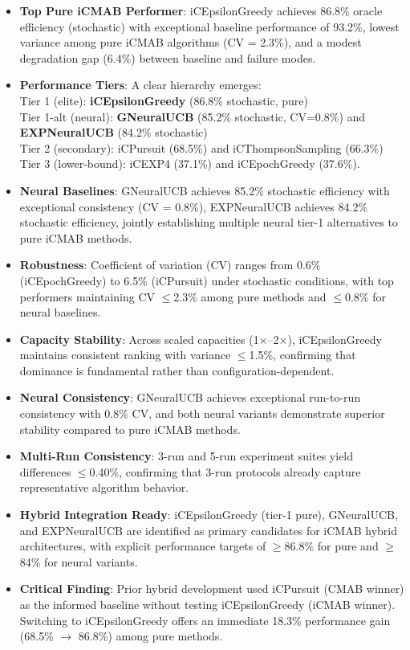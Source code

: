 \documentclass[12pt,a4paper]{article}
\newcommand{\primarytext}[1]{\textcolor{primaryblue}{\textbf{#1}}}
\newcommand{\secondarytext}[1]{\textcolor{secondaryblue}{\textbf{#1}}}
\newcommand{\success}[1]{\textcolor{accentgreen}{\textbf{#1}}}
\newcommand{\warning}[1]{\textcolor{warningred}{\textbf{#1}}}
\newcommand{\legacy}[1]{\textcolor{legacycolor}{\textbf{#1}}}
\newcommand{\neural}[1]{\textcolor{neuralcolor}{\textbf{#1}}}
\begin{document}
\begin{tcolorbox}[colback=highlightgray,colframe=primaryblue,title=\textbf{Executive Summary}]
\begin{itemize}
\item \primarytext{Top Pure iCMAB Performer}: iCEpsilonGreedy achieves 86.8\% oracle efficiency (stochastic) with exceptional baseline performance of 93.2\%, lowest variance among pure iCMAB algorithms (CV = 2.3\%), and a modest degradation gap (6.4\%) between baseline and failure modes.
\item \secondarytext{Performance Tiers}: A clear hierarchy emerges: \\
  \quad Tier 1 (elite): \primarytext{iCEpsilonGreedy} (86.8\% stochastic, pure) \\
  \quad Tier 1-alt (neural): \neural{GNeuralUCB} (85.2\% stochastic, CV=0.8\%) and \legacy{EXPNeuralUCB} (84.2\% stochastic) \\
  \quad Tier 2 (secondary): iCPursuit (68.5\%) and iCThompsonSampling (66.3\%) \\
  \quad Tier 3 (lower-bound): iCEXP4 (37.1\%) and iCEpochGreedy (37.6\%).
\item \neural{Neural Baselines}: GNeuralUCB achieves 85.2\% stochastic efficiency with exceptional consistency (CV = 0.8\%), EXPNeuralUCB achieves 84.2\% stochastic efficiency, jointly establishing multiple neural tier-1 alternatives to pure iCMAB methods.
\item \success{Robustness}: Coefficient of variation (CV) ranges from 0.6\% (iCEpochGreedy) to 6.5\% (iCPursuit) under stochastic conditions, with top performers maintaining CV $\leq$2.3\% among pure methods and $\leq$0.8\% for neural baselines.
\item \success{Capacity Stability}: Across scaled capacities (1$\times$--2$\times$), iCEpsilonGreedy maintains consistent ranking with variance $\leq$1.5\%, confirming that dominance is fundamental rather than configuration-dependent.
\item \neural{Neural Consistency}: GNeuralUCB achieves exceptional run-to-run consistency with 0.8\% CV, and both neural variants demonstrate superior stability compared to pure iCMAB methods.
\item \success{Multi-Run Consistency}: 3-run and 5-run experiment suites yield differences $\leq$0.40\%, confirming that 3-run protocols already capture representative algorithm behavior.
\item \primarytext{Hybrid Integration Ready}: iCEpsilonGreedy (tier-1 pure), GNeuralUCB, and EXPNeuralUCB are identified as primary candidates for iCMAB hybrid architectures, with explicit performance targets of $\geq$86.8\% for pure and $\geq$84\% for neural variants.
\item \warning{Critical Finding}: Prior hybrid development used iCPursuit (CMAB winner) as the informed baseline without testing iCEpsilonGreedy (iCMAB winner). Switching to iCEpsilonGreedy offers an immediate 18.3\% performance gain (68.5\% $\rightarrow$ 86.8\%) among pure methods.
\end{itemize}
\end{tcolorbox}
\end{document}
